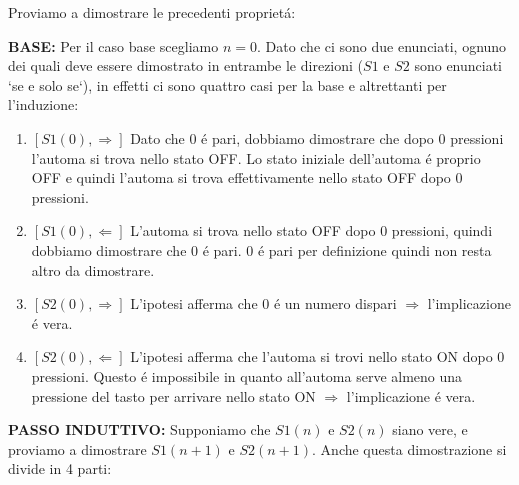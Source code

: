 		Proviamo a dimostrare le precedenti propriet\'a:
		
		\textbf{BASE:} Per il caso base scegliamo $n=0$. Dato che ci sono due
		enunciati, ognuno dei quali deve essere dimostrato in entrambe le
		direzioni ($S1$ e $S2$ sono enunciati `se e solo se`), in effetti ci sono
		quattro casi per la base e altrettanti per l'induzione:
		\begin{enumerate}
		  \item $[S1(0), \Rightarrow]$ Dato che $0$ \'e pari, dobbiamo dimostrare che dopo $0$
		  pressioni l'automa si trova nello stato OFF. Lo stato iniziale dell'automa \'e proprio
		  OFF e quindi l'automa si trova effettivamente nello stato OFF dopo $0$
		  pressioni.
		  \item $[S1(0), \Leftarrow]$ L'automa si trova nello stato OFF dopo $0$
		  pressioni, quindi dobbiamo dimostrare che $0$ \'e pari. $0$ \'e pari per
		  definizione quindi non resta altro da dimostrare.
		  \item $[S2(0), \Rightarrow]$ L'ipotesi afferma che $0$ \'e un numero dispari
		  $\Rightarrow$ l'implicazione \'e vera.
		  \item $[S2(0), \Leftarrow]$ L'ipotesi afferma che l'automa si trovi
		  nello stato ON dopo $0$ pressioni. Questo \'e impossibile in quanto all'automa
		  serve almeno una pressione del tasto per arrivare nello stato ON
		  $\Rightarrow$ l'implicazione \'e vera.
		\end{enumerate}
		
		\textbf{PASSO INDUTTIVO:} Supponiamo che $S1(n)$ e $S2(n)$ siano vere, e
		proviamo a dimostrare $S1(n+1)$ e $S2(n+1)$. Anche questa dimostrazione si divide in 4
		parti:
		
